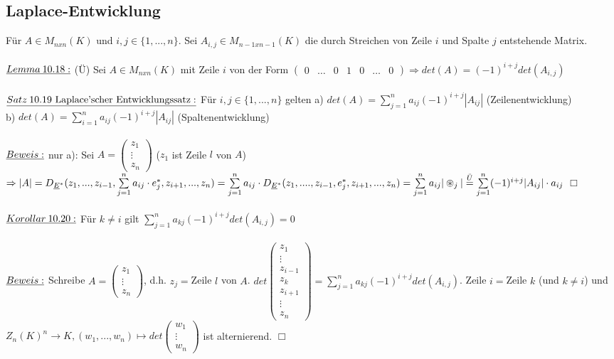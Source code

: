 \documentclass[fleqn, a4paper, 11pt]{scrartcl}
\theoremstyle{definition}
\begin{document}
\subsection{Laplace-Entwicklung}

Für $A\in M_{nxn}(K)$ und $i,j\in\{1,...,n\}$. Sei $A_{i,j}\in M_{n-1xn-1}(K)$ die durch Streichen von Zeile $i$ und Spalte $j$ entstehende Matrix.\\
\\
$\uline{Lemma\:10.18:}$ (\"U) Sei $A\in M_{nxn}(K)$ mit Zeile $i$ von der Form $\begin{pmatrix}
	0 & \dots & 0 & 1 & 0 & \dots & 0
\end{pmatrix}\Rightarrow det(A)=(-1)^{i+j}det(A_{i,j})$\\
\\
$\uline{Satz\:10.19\text{ Laplace'scher Entwicklungssatz}:}$ Für $i,j\in\{1,...,n\}$ gelten a) $det(A)=\sum\limits_{j=1}^n a_{ij}(-1)^{i+j}|A_{ij}|$ (Zeilenentwicklung)\\
b) $det(A)=\sum\limits_{i=1}^n a_{ij}(-1)^{i+j}|A_{ij}|$ (Spaltenentwicklung)\\
\\
$\uline{Beweis:}$ nur a): Sei $A=\begin{pmatrix}
	z_1\\
	\vdots\\
	z_n
\end{pmatrix}$ ($z_1$ ist Zeile $l$ von $A$)$\Rightarrow |A|=D_{\uline{E}^{\ast}}(z_1,...,z_{i-1},\sum\limits_{j=1}^n a_{ij}\cdot e_j^{\ast},z_{i+1},...,z_n)=\sum\limits_{j=1}^n a_{ij}\cdot D_{\uline{E}^{\ast}}(z_1,....,z_{i-1},e_j^{\ast},z_{i+1},...,z_n)=\sum\limits_{j=1}^n a_{ij}|\circledast_j |\stackrel{\ddot{U}}{=}\sum\limits_{j=1}^n (-1)^{i+j}|A_{ij}|\cdot a_{ij}$ \hfill $\Box$\\
\\
$\uline{Korollar\:10.20:}$ Für $k\neq i$ gilt  $\sum\limits_{j=1}^n a_{kj}(-1)^{i+j}det(A_{i,j})=0$\\
\\
$\uline{Beweis:}$ Schreibe $A=\begin{pmatrix}
	z_1\\
	\vdots\\
	z_n
\end{pmatrix}$, d.h. $z_j=$Zeile $l$ von $A$. $det\begin{pmatrix}
	z_1\\
	\vdots\\
	z_{i-1}\\
	z_k\\
	z_{i+1}\\
	\vdots\\
	z_n
\end{pmatrix}=\sum\limits_{j=1}^n a_{kj}(-1)^{i+j}det(A_{i,j})$. Zeile $i=$Zeile $k$ (und $k\neq i$) und $Z_n(K)^n\rightarrow K,(w_1,...,w_n)\mapsto det\begin{pmatrix}
	w_1\\
	\vdots\\
	w_n
\end{pmatrix}$ ist alternierend. \hfill $\Box$\\
\end{document}
